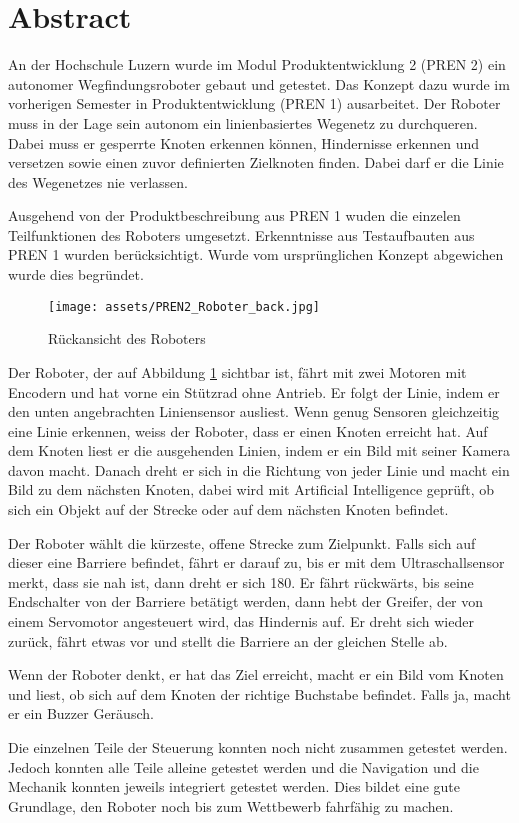 \section*{Abstract}


An der Hochschule Luzern wurde im Modul Produktentwicklung 2 (PREN 2) ein autonomer Wegfindungsroboter gebaut und getestet. Das Konzept dazu wurde im vorherigen Semester in Produktentwicklung (PREN 1) ausarbeitet. Der Roboter muss in der Lage sein autonom ein linienbasiertes Wegenetz zu durchqueren. Dabei muss er gesperrte Knoten erkennen können, Hindernisse erkennen und versetzen sowie einen zuvor definierten Zielknoten finden. Dabei darf er die Linie des Wegenetzes nie verlassen.


Ausgehend von der Produktbeschreibung aus PREN 1 wuden die einzelen Teilfunktionen des Roboters umgesetzt. Erkenntnisse aus Testaufbauten aus PREN 1 wurden berücksichtigt. Wurde vom ursprünglichen Konzept abgewichen wurde dies begründet. 

\begin{figure}[H]
    \centering
    \texttt{[image: assets/PREN2\_Roboter\_back.jpg]}
    \caption{Rückansicht des Roboters}
    \label{fig:roboter_back}
\end{figure}


Der Roboter, der auf Abbildung \ref{fig:roboter_back} sichtbar ist, fährt mit zwei Motoren mit Encodern und hat vorne ein Stützrad ohne Antrieb. Er folgt der Linie, indem er den unten angebrachten Liniensensor ausliest. Wenn genug Sensoren gleichzeitig eine Linie erkennen, weiss der Roboter, dass er einen Knoten erreicht hat. Auf dem Knoten liest er die ausgehenden Linien, indem er ein Bild mit seiner Kamera davon macht. Danach dreht er sich in die Richtung von jeder Linie und macht ein Bild zu dem nächsten Knoten, dabei wird mit Artificial Intelligence geprüft, ob sich ein Objekt auf der Strecke oder auf dem nächsten Knoten befindet.

Der Roboter wählt die kürzeste, offene Strecke zum Zielpunkt. Falls sich auf dieser eine Barriere befindet, fährt er darauf zu, bis er mit dem Ultraschallsensor merkt, dass sie nah ist, dann dreht er sich 180\textdegree. Er fährt rückwärts, bis seine Endschalter von der Barriere betätigt werden, dann hebt der Greifer, der von einem Servomotor angesteuert wird, das Hindernis auf. Er dreht sich wieder zurück, fährt etwas vor und stellt die Barriere an der gleichen Stelle ab.

Wenn der Roboter denkt, er hat das Ziel erreicht, macht er ein Bild vom Knoten und liest, ob sich auf dem Knoten der richtige Buchstabe befindet. Falls ja, macht er ein Buzzer Geräusch.


Die einzelnen Teile der Steuerung konnten noch nicht zusammen getestet werden. Jedoch konnten alle Teile alleine getestet werden und die Navigation und die Mechanik konnten jeweils integriert getestet werden. Dies bildet eine gute Grundlage, den Roboter noch bis zum Wettbewerb fahrfähig zu machen.
